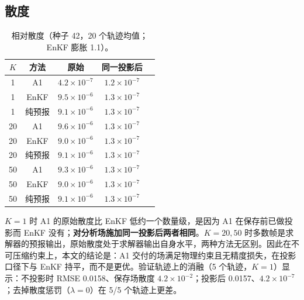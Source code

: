 \documentclass[10.5pt,a4paper]{article}
\begin{document}
\subsection{散度}
\begin{table}[H]\centering\small\caption{相对散度（种子 42，20 个轨迹均值；EnKF 膨胀 1.1）。}
\begin{tabular}{ccccc}\toprule
$K$ & 方法 & 原始 & 同一投影后\\\midrule
1 & A1 & $4.2\times10^{-7}$ & $1.2\times10^{-7}$ \\
1 & EnKF & $9.5\times10^{-6}$ & $1.3\times10^{-7}$ \\
1 & 纯预报 & $9.1\times10^{-6}$ & $1.3\times10^{-7}$ \\
20 & A1 & $9.6\times10^{-6}$ & $1.3\times10^{-7}$ \\
20 & EnKF & $9.0\times10^{-6}$ & $1.3\times10^{-7}$ \\
20 & 纯预报 & $9.1\times10^{-6}$ & $1.3\times10^{-7}$ \\
50 & A1 & $9.3\times10^{-6}$ & $1.3\times10^{-7}$ \\
50 & EnKF & $9.0\times10^{-6}$ & $1.3\times10^{-7}$ \\
50 & 纯预报 & $9.1\times10^{-6}$ & $1.3\times10^{-7}$ \\
\bottomrule\end{tabular}\end{table}
$K=1$ 时 A1 的原始散度比 EnKF 低约一个数量级，是因为 A1 在保存前已做投影而 EnKF 没有；\textbf{对分析场施加同一投影后两者相同}。$K=20,50$ 时多数帧是求解器的预报输出，原始散度处于求解器输出自身水平，两种方法无区别。因此在不可压缩约束上，本文的结论是：A1 交付的场满足物理约束且无精度损失，在投影口径下与 EnKF 持平，而不是更优。验证轨迹上的消融（5 个轨迹，$K=1$）显示：不投影时 RMSE 0.0158、保存场散度 $4.2\times10^{-2}$；投影后 0.0157、$4.2\times10^{-7}$；去掉散度惩罚（$\lambda=0$）在 5/5 个轨迹上更差。
\end{document}
